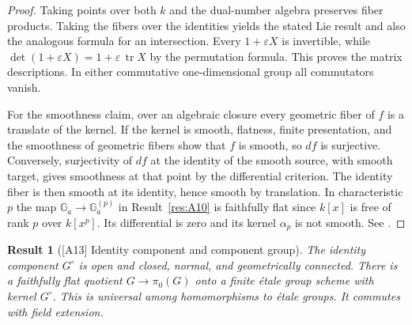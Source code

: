 \documentclass[11pt,a4paper,openany,oneside]{book}
\theoremstyle{resultstyle}
\newtheorem{statement}{Result}[chapter]
\newenvironment{result}[2]{\clubpenalty=10000\begin{statement}[\textnormal{[#1]} #2]\leavevmode\label{res:#1}\ignorespaces}{\end{statement}}
\theoremstyle{definition}
\numberwithin{equation}{chapter}
\begin{document}
\begin{proof}
Taking points over both \(k\) and the dual-number algebra preserves
fiber products. Taking the fibers over the identities yields the
stated Lie result and also the analogous formula for an intersection.
Every \(1+\varepsilon X\) is invertible, while
\(\det(1+\varepsilon X)=1+\varepsilon\,\operatorname{tr} X\) by the
permutation formula. This proves the matrix descriptions. In either
commutative one-dimensional group all commutators vanish.

For the smoothness claim, over an algebraic closure every geometric
fiber of \(f\) is a translate of the kernel. If the kernel is smooth,
flatness, finite presentation, and the smoothness of geometric fibers
show that \(f\) is smooth, so \(df\) is surjective. Conversely,
surjectivity of \(df\) at the identity of the smooth source,
with smooth target, gives smoothness at that point by the
differential criterion. The identity fiber is then smooth at its
identity, hence smooth by translation. In characteristic \(p\) the
map \(\mathbb G_a\to\mathbb G_a^{(p)}\) in Result~\ref{res:A10} is
faithfully flat since \(k[x]\) is free of rank \(p\) over \(k[x^p]\).
Its differential is zero and its kernel \(\alpha_p\) is not smooth.
See \cite[Proposition 1.63, 10.7--10.14 and Remark 10.24]{milne}.
\end{proof}

\begin{result}{A13}{Identity component and component group}
The identity component \(G^\circ\) is open and closed, normal, and
geometrically connected. There is a faithfully flat quotient
\(G\to\pi_0(G)\) onto a finite étale group scheme with kernel \(G^\circ\).
This is universal among homomorphisms to étale groups. It commutes
with field extension.
\end{result}
\end{document}
